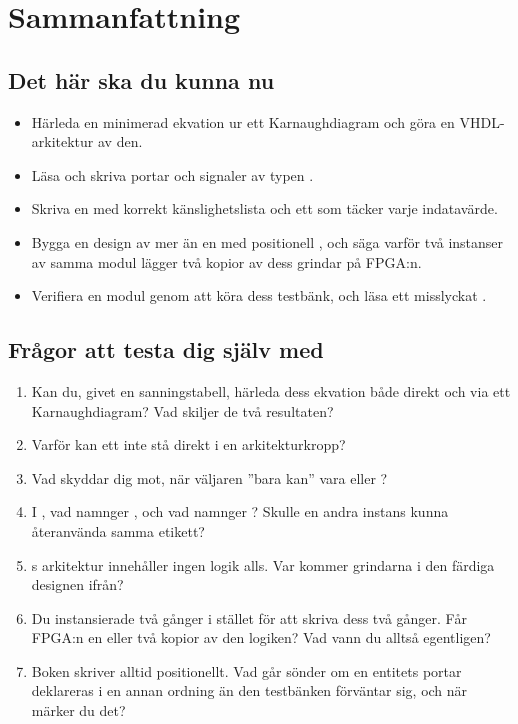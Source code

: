 
\section{Sammanfattning}
\label{c2:sec:review}

\subsection*{Det här ska du kunna nu}
\begin{itemize}
  \item Härleda en minimerad ekvation ur ett Karnaughdiagram och göra en VHDL-arkitektur av den.
  \item Läsa och skriva portar och signaler av typen .
  \item Skriva en  med korrekt känslighetslista och ett  som täcker varje
    indatavärde.
  \item Bygga en design av mer än en  med positionell , och säga
    varför två instanser av samma modul lägger två kopior av dess grindar på FPGA:n.
  \item Verifiera en modul genom att köra dess testbänk, och läsa ett misslyckat .
\end{itemize}

\subsection*{Frågor att testa dig själv med}
\begin{enumerate}
  \item Kan du, givet en sanningstabell, härleda dess ekvation både direkt och via ett
    Karnaughdiagram? Vad skiljer de två resultaten?
  \item Varför kan ett  inte stå direkt i en arkitekturkropp?
  \item Vad skyddar  dig mot, när väljaren ”bara kan” vara  eller
    ?
  \item I , vad namnger , och vad namnger
    ? Skulle en andra instans kunna återanvända samma etikett?
  \item {}s arkitektur innehåller ingen logik alls. Var kommer grindarna i den
    färdiga designen ifrån?
  \item Du instansierade  två gånger i stället för att skriva dess  två
    gånger. Får FPGA:n en eller två kopior av den logiken? Vad vann du alltså egentligen?
  \item Boken skriver alltid  positionellt. Vad går sönder om en entitets portar
    deklareras i en annan ordning än den testbänken förväntar sig, och när märker du det?
\end{enumerate}

